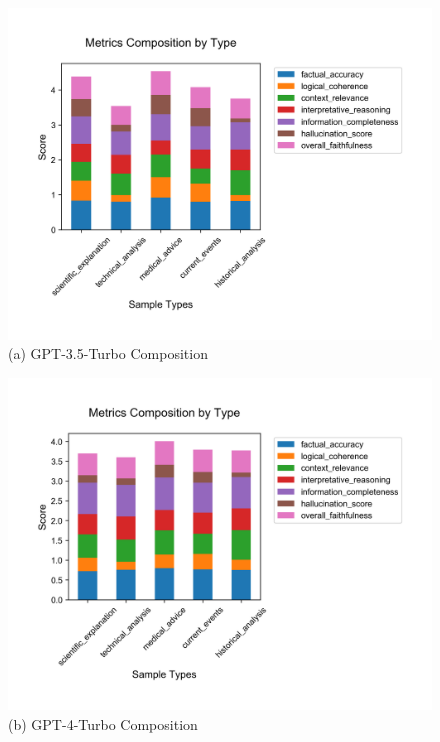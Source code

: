 \begin{figure}[!htbp]
\centering
\begin{minipage}[t]{0.32\textwidth}
    \centering
    \includegraphics[width=\textwidth]{figures/visualization/metrics_stacked_bar_gpt-3.5-turbo.png}
    {\footnotesize (a) GPT-3.5-Turbo Composition}
\end{minipage}%
\begin{minipage}[t]{0.32\textwidth}
    \centering
    \includegraphics[width=\textwidth]{figures/visualization/metrics_stacked_bar_gpt-4-turbo.png}
    {\footnotesize (b) GPT-4-Turbo Composition}
\end{minipage}%
\begin{minipage}[t]{0.32\textwidth}

\end{minipage}
\end{figure}
